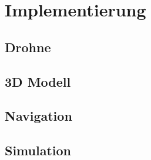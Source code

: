 \chapter{Implementierung}

\section{Drohne}

\section{3D Modell}

\section{Navigation}

\section{Simulation}

